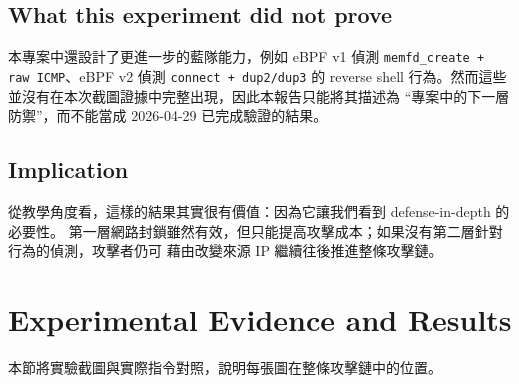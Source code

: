 \documentclass[UTF8,11pt]{ctexart}
\begin{document}
\subsection{What this experiment did not prove}
本專案中還設計了更進一步的藍隊能力，例如 eBPF v1 偵測
\texttt{memfd\_create + raw ICMP}、eBPF v2 偵測 \texttt{connect + dup2/dup3} 的 reverse shell
行為。然而這些並沒有在本次截圖證據中完整出現，因此本報告只能將其描述為
``專案中的下一層防禦''，而不能當成 2026-04-29 已完成驗證的結果。

\subsection{Implication}
從教學角度看，這樣的結果其實很有價值：因為它讓我們看到 defense-in-depth 的必要性。
第一層網路封鎖雖然有效，但只能提高攻擊成本；如果沒有第二層針對行為的偵測，攻擊者仍可
藉由改變來源 IP 繼續往後推進整條攻擊鏈。

\section{Experimental Evidence and Results}

本節將實驗截圖與實際指令對照，說明每張圖在整條攻擊鏈中的位置。
\end{document}
